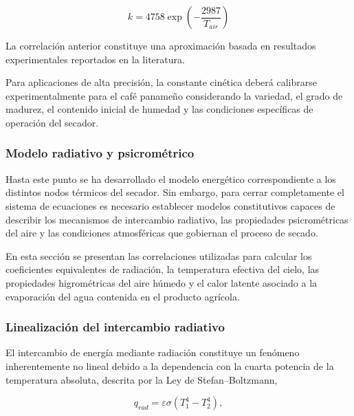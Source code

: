 \begin{equation}
\boxed{
k=
4758
\exp
\left(
-\frac{2987}{T_{air}}
\right)
}
\end{equation}

\begin{tcolorbox}[title=Importante,colback=red!2,colframe=red!70!black]

La correlación anterior constituye una aproximación basada en resultados experimentales reportados en la literatura.

Para aplicaciones de alta precisión, la constante cinética deberá calibrarse experimentalmente para el café panameño considerando la variedad, el grado de madurez, el contenido inicial de humedad y las condiciones específicas de operación del secador.

\end{tcolorbox}


\subsubsection{Modelo radiativo y psicrométrico}

Hasta este punto se ha desarrollado el modelo energético correspondiente a los distintos nodos térmicos del secador. Sin embargo, para cerrar completamente el sistema de ecuaciones es necesario establecer modelos constitutivos capaces de describir los mecanismos de intercambio radiativo, las propiedades psicrométricas del aire y las condiciones atmosféricas que gobiernan el proceso de secado.

En esta sección se presentan las correlaciones utilizadas para calcular los coeficientes equivalentes de radiación, la temperatura efectiva del cielo, las propiedades higrométricas del aire húmedo y el calor latente asociado a la evaporación del agua contenida en el producto agrícola.

\subsubsection{Linealización del intercambio radiativo}

El intercambio de energía mediante radiación constituye un fenómeno inherentemente no lineal debido a la dependencia con la cuarta potencia de la temperatura absoluta, descrita por la Ley de Stefan--Boltzmann,

\begin{equation}
q_{rad}
=
\varepsilon
\sigma
\left(
T_1^4-T_2^4
\right),
\end{equation}

